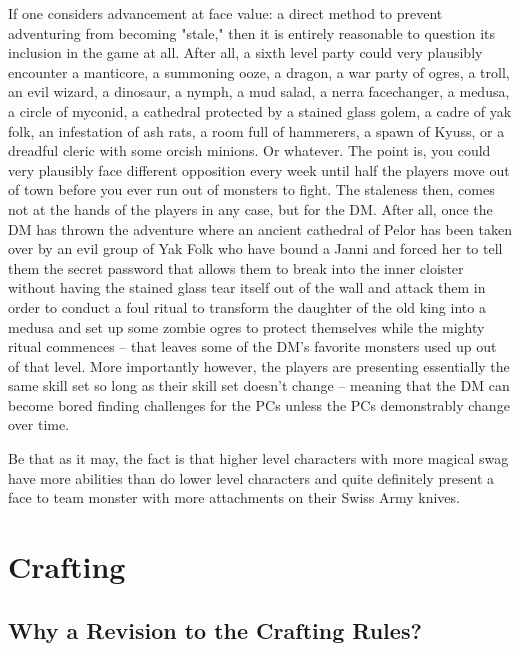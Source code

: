 If one considers advancement at face value: a direct method to prevent adventuring from becoming "stale," then it is entirely reasonable to question its inclusion in the game at all. After all, a sixth level party could very plausibly encounter a manticore, a summoning ooze, a dragon, a war party of ogres, a troll, an evil wizard, a dinosaur, a nymph, a mud salad, a nerra facechanger, a medusa, a circle of myconid, a cathedral protected by a stained glass golem, a cadre of yak folk, an infestation of ash rats, a room full of hammerers, a spawn of Kyuss, or a dreadful cleric with some orcish minions. Or whatever. The point is, you could very plausibly face different opposition every week until half the players move out of town before you ever run out of monsters to fight. The staleness then, comes not at the hands of the players in any case, but for the DM. After all, once the DM has thrown the adventure where an ancient cathedral of Pelor has been taken over by an evil group of Yak Folk who have bound a Janni and forced her to tell them the secret password that allows them to break into the inner cloister without having the stained glass tear itself out of the wall and attack them in order to conduct a foul ritual to transform the daughter of the old king into a medusa and set up some zombie ogres to protect themselves while the mighty ritual commences -- that leaves some of the DM's favorite monsters used up out of that level. More importantly however, the players are presenting essentially the same skill set so long as their skill set doesn't change -- meaning that the DM can become bored finding challenges for the PCs unless the PCs demonstrably change over time.

Be that as it may, the fact is that higher level characters with more magical swag have more abilities than do lower level characters and quite definitely present a face to team monster with more attachments on their Swiss Army knives.


\section{Crafting}

\subsection{Why a Revision to the Crafting Rules?}

